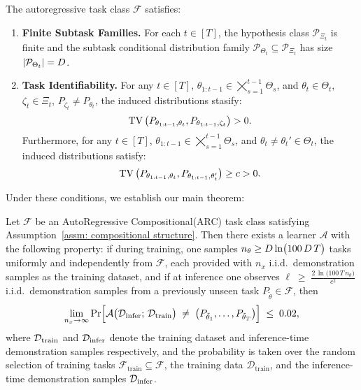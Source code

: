 \begin{assumption}\label{assm: compositional structure}
The autoregressive task class $\mathcal{F}$ satisfies:
\begin{enumerate}[leftmargin=0.4 cm]
    \item \textbf{Finite Subtask Families.} For each $t \in [T]$, the hypothesis class $\mathcal{P}_{\Xi_t}$ is finite and the subtask conditional distribution family $\mathcal{P}_{\Theta_t} \subseteq \mathcal{P}_{\Xi_t}$ has size $|\mathcal{P}_{\Theta_t}| = D$.


    \item \textbf{Task Identifiability.} For any $t \in [T]$,  $\theta_{1:t-1} \in \bigtimes_{s=1}^{t-1} \Theta_s$, and  $\theta_t \in \Theta_t$, $\zeta_t \in \Xi_t $, $P_{\zeta_t}\neq P_{\theta_t}$, the induced distributions stasify:
    \[
    \tv\left(P_{\theta_{1:t-1}, \theta_t}, P_{\theta_{1:t-1}, \zeta_t}\right) > 0.
    \vspace{-2mm}
    \]
    Furthermore, for any $t \in [T]$,  $\theta_{1:t-1} \in \bigtimes_{s=1}^{t-1} \Theta_s$, and $\theta_t \neq \theta_t' \in \Theta_t$, the induced distributions satisfy:
    \[
    \tv\left(P_{\theta_{1:t-1},\theta_t}, P_{\theta_{1:t-1},\theta_t'}\right) \geq c > 0.
        \vspace{-2mm}
    \]

\end{enumerate}
\end{assumption}



Under these conditions, we establish our main theorem:


\begin{theorem}\label{thm:exponential task generalization}
Let $\mathcal{F}$ be an AutoRegressive Compositional(ARC) task class satisfying Assumption~\ref{assm: compositional structure}. Then there exists a learner $\mathcal{A}$ with the following property: if during training, one samples $n_{\theta} \ge D \ln\bigl(100\,D\,T\bigr)$ tasks uniformly and independently from $\mathcal{F}$, each provided with $n_x$ i.i.d.\  demonstration samples as the training dataset, and if at inference one observes $\ell \;\ge\; \frac{2\,\ln\bigl(100\,T\,n_{\theta}\bigr)}{c^2}$
i.i.d.\ demonstration samples from a previously unseen task $P_{\tilde{\theta}}\in\mathcal{F}$, then
\[
\lim_{n_x \to \infty} 
\Pr\Bigl[
  \mathcal{A}\bigl(\mathcal{D}_{\mathrm{infer}};\,\mathcal{D}_{\mathrm{train}}\bigr)
  \;\neq\;
  \bigl(P_{\tilde{\theta}_1}, \dots, P_{\tilde{\theta}_T}\bigr)
\Bigr]
\;\le\; 0.02,
\]
where ${\mathcal{D}}_{\mathrm{train}}$ and ${\mathcal{D}}_{\mathrm{infer}}$ denote the training dataset and inference-time demonstration samples respectively, and the probability is taken over the random selection of training tasks 
$\mathcal{F}_{\mathrm{train}} \subseteq \mathcal{F}$, 
the training data $\mathcal{D}_{\mathrm{train}}$, 
and the inference-time demonstration samples $\mathcal{D}_{\mathrm{infer}}$. 
\end{theorem}


